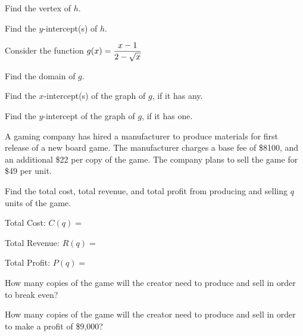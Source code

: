 \documentclass[11pt]{exam}
\begin{document}
\begin{questions}
\begin{multicols}{2}
\begin{compactenum}[(a)]
\item Find the vertex of $h$.
\vspace{1.5cm}

\item Find the $y$-intercept(s) of $h$.
\vspace{1.5cm}
\end{compactenum}
\end{multicols}

\question[3] Consider the function $\displaystyle{g(x)=\frac{x-1}{2-\sqrt{x}}}$

\begin{compactenum}[(a)]
\item Find the domain of $g$.
\vspace{4cm}

\item Find the $x$-intercept(s) of the graph of $g$, if it has any.
\vspace{4cm}

\item Find the $y$-intercept of the graph of $g$, if it has one.

\end{compactenum}
\newpage

\question[5] A gaming company has hired a manufacturer to produce materials for first release of a new board game.  The manufacturer charges a base fee of \$8100, and an additional \$22 per copy of the game.  The company plans to sell the game for \$49 per unit.
\begin{compactenum}[(a)]
\item Find the total cost, total revenue, and total profit from producing and selling $q$ units of the game.
\vspace{1cm}

\p Total Cost: $C(q)=$
\vspace{1.5cm}

\p Total Revenue: $R(q)=$
\vspace{1.5cm}

\p Total Profit: $P(q)=$
\vspace{1.5cm}

\item How many copies of the game will the creator need to produce and sell in order to break even?
\vspace{6cm}

\item How many copies of the game will the creator need to produce and sell in order to make a profit of \$9,000?
\vspace{4cm}


\end{compactenum}
\end{questions}
\end{document}
